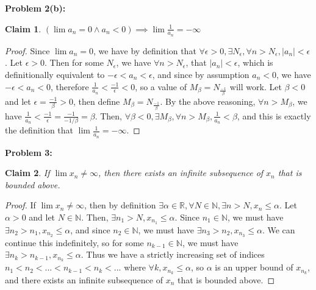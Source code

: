\documentclass{article}
\newcommand{\reals}{\ensuremath{\mathbb{R}}}
\newcommand{\nats}{\ensuremath{\mathbb{N}}}
\newcommand{\eps}{\ensuremath{\epsilon}}
\newtheorem{clm}{Claim}
\begin{document}
\textbf{Problem 2(b):}

\begin{clm}
	$(\lim a_n = 0 \land a_n < 0) \implies \lim \frac{1}{a_n} = -\infty$
\end{clm}

\begin{proof}
	Since $\lim a_n = 0$,
	we have by definition that
	$\forall \eps > 0,
	\exists N_\eps,
	\forall n > N_\eps,
	|a_n| < \eps$.
	Let $\eps > 0$.
	Then for some $N_\eps$,
	we have $\forall n > N_\eps$,
	that $|a_n| < \eps$,
	which is definitionally equivalent
	to $-\eps < a_n < \eps$,
	and since by assumption $a_n < 0$,
	we have $-\eps < a_n < 0$,
	therefore $\frac{1}{a_n} < \frac{-1}{\eps} < 0$,
	so a value of $M_\beta = N_\frac{-1}{\beta}$ will work.
	Let $\beta < 0$
	and let $\eps = \frac{-1}{\beta} > 0$,
	then define
	$M_\beta = N_\frac{-1}{\beta}$.
	By the above reasoning,
	$\forall n > M_\beta$,
	we have $\frac{1}{a_n} < \frac{-1}{\eps} = \frac{-1}{-1/\beta} = \beta$.
	Then,
	$\forall \beta < 0,
	\exists M_\beta,
	\forall n > M_\beta,
	\frac{1}{a_n} < \beta$,
	and this is exactly the definition that
	$\lim \frac{1}{a_n} = -\infty$.
\end{proof}

\textbf{Problem 3:}

\begin{clm}
	If $\lim x_n \neq \infty$,
	then there exists an infinite subsequence of $x_n$
	that is bounded above.
\end{clm}

\begin{proof}
	If $\lim x_n \neq \infty$,
	then by definition
	$\exists \alpha \in \reals, \forall N \in \nats, \exists n > N, x_n \le \alpha$.
	Let $\alpha > 0$ and let $N \in \nats$.
	Then, $\exists n_1 > N, x_{n_1} \le \alpha$.
	Since $n_1 \in \nats$, we must have $\exists n_2 > n_1, x_{n_2} \le \alpha$,
	and since $n_2 \in \nats$, we must have $\exists n_3 > n_2, x_{n_3} \le \alpha$.
	We can continue this indefinitely,
	so for some $n_{k-1} \in \nats$, we must have $\exists n_k > n_{k-1}, x_{n_k} \le \alpha$.
	Thus we have a strictly increasing set of indices $n_1 < n_2 < ... < n_{k-1} < n_k < ...$
	where $\forall k, x_{n_k} \le \alpha$,
	so $\alpha$ is an upper bound of $x_{n_k}$,
	and there exists an infinite subsequence of $x_n$
	that is bounded above.
\end{proof}
\end{document}
